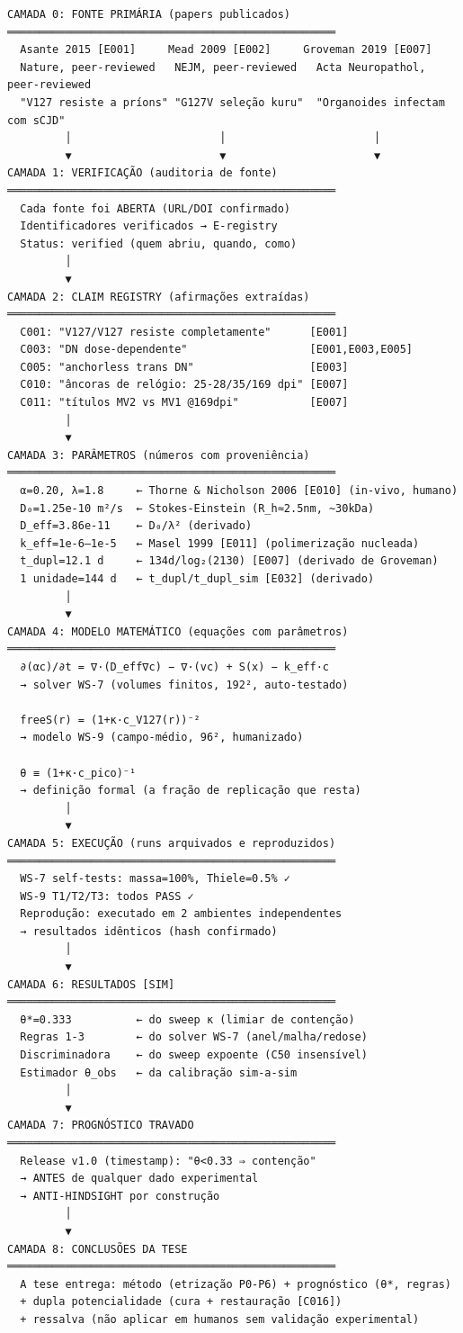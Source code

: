 \documentclass[
  10pt,
]{article}
\begin{document}
\begin{verbatim}
CAMADA 0: FONTE PRIMÁRIA (papers publicados)
═══════════════════════════════════════════════════
  Asante 2015 [E001]     Mead 2009 [E002]     Groveman 2019 [E007]
  Nature, peer-reviewed   NEJM, peer-reviewed   Acta Neuropathol, peer-reviewed
  "V127 resiste a príons" "G127V seleção kuru"  "Organoides infectam com sCJD"
         │                       │                       │
         ▼                       ▼                       ▼
CAMADA 1: VERIFICAÇÃO (auditoria de fonte)
═══════════════════════════════════════════════════
  Cada fonte foi ABERTA (URL/DOI confirmado)
  Identificadores verificados → E-registry
  Status: verified (quem abriu, quando, como)
         │
         ▼
CAMADA 2: CLAIM REGISTRY (afirmações extraídas)
═══════════════════════════════════════════════════
  C001: "V127/V127 resiste completamente"      [E001]
  C003: "DN dose-dependente"                   [E001,E003,E005]
  C005: "anchorless trans DN"                  [E003]
  C010: "âncoras de relógio: 25-28/35/169 dpi" [E007]
  C011: "títulos MV2 vs MV1 @169dpi"           [E007]
         │
         ▼
CAMADA 3: PARÂMETROS (números com proveniência)
═══════════════════════════════════════════════════
  α=0.20, λ=1.8     ← Thorne & Nicholson 2006 [E010] (in-vivo, humano)
  D₀=1.25e-10 m²/s  ← Stokes-Einstein (R_h≈2.5nm, ~30kDa)
  D_eff=3.86e-11    ← D₀/λ² (derivado)
  k_eff=1e-6–1e-5   ← Masel 1999 [E011] (polimerização nucleada)
  t_dupl=12.1 d     ← 134d/log₂(2130) [E007] (derivado de Groveman)
  1 unidade=144 d   ← t_dupl/t_dupl_sim [E032] (derivado)
         │
         ▼
CAMADA 4: MODELO MATEMÁTICO (equações com parâmetros)
═══════════════════════════════════════════════════
  ∂(αc)/∂t = ∇·(D_eff∇c) − ∇·(vc) + S(x) − k_eff·c
  → solver WS-7 (volumes finitos, 192², auto-testado)

  freeS(r) = (1+κ·c_V127(r))⁻²
  → modelo WS-9 (campo-médio, 96², humanizado)

  θ ≡ (1+κ·c_pico)⁻¹
  → definição formal (a fração de replicação que resta)
         │
         ▼
CAMADA 5: EXECUÇÃO (runs arquivados e reproduzidos)
═══════════════════════════════════════════════════
  WS-7 self-tests: massa=100%, Thiele=0.5% ✓
  WS-9 T1/T2/T3: todos PASS ✓
  Reprodução: executado em 2 ambientes independentes
  → resultados idênticos (hash confirmado)
         │
         ▼
CAMADA 6: RESULTADOS [SIM]
═══════════════════════════════════════════════════
  θ*=0.333          ← do sweep κ (limiar de contenção)
  Regras 1-3        ← do solver WS-7 (anel/malha/redose)
  Discriminadora    ← do sweep expoente (C50 insensível)
  Estimador θ_obs   ← da calibração sim-a-sim
         │
         ▼
CAMADA 7: PROGNÓSTICO TRAVADO
═══════════════════════════════════════════════════
  Release v1.0 (timestamp): "θ<0.33 ⇒ contenção"
  → ANTES de qualquer dado experimental
  → ANTI-HINDSIGHT por construção
         │
         ▼
CAMADA 8: CONCLUSÕES DA TESE
═══════════════════════════════════════════════════
  A tese entrega: método (etrização P0-P6) + prognóstico (θ*, regras)
  + dupla potencialidade (cura + restauração [C016])
  + ressalva (não aplicar em humanos sem validação experimental)
\end{verbatim}
\end{document}
